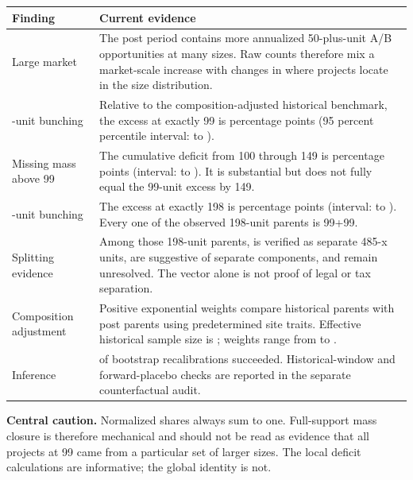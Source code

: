 \documentclass[10pt]{article}
\begin{document}
\begin{tabular}{>{\raggedright\arraybackslash}p{} p{}}
\toprule
\textbf{Finding} & \textbf{Current evidence} \\
\midrule
Large market & The post period contains more annualized 50-plus-unit A/B opportunities at many sizes. Raw counts therefore mix a market-scale increase with changes in where projects locate in the size distribution. \\
\addlinespace
99-unit bunching & Relative to the composition-adjusted historical benchmark, the excess at exactly 99 is \ExcessNinetyNine{} percentage points (95 percent percentile interval: \ExcessNinetyNineLower{} to \ExcessNinetyNineUpper{}). \\
\addlinespace
Missing mass above 99 & The cumulative deficit from 100 through 149 is \DeficitOneHundredOneFortyNine{} percentage points (interval: \DeficitOneHundredOneFortyNineLower{} to \DeficitOneHundredOneFortyNineUpper{}). It is substantial but does not fully equal the 99-unit excess by 149. \\
\addlinespace
198-unit bunching & The excess at exactly 198 is \ExcessOneNinetyEight{} percentage points (interval: \ExcessOneNinetyEightLower{} to \ExcessOneNinetyEightUpper{}). Every one of the \ExactOneNinetyEightParents{} observed 198-unit parents is 99+99. \\
\addlinespace
Splitting evidence & Among those 198-unit parents, \VerifiedOneNinetyEight{} is verified as separate 485-x units, \SuggestiveOneNinetyEight{} are suggestive of separate components, and \UnresolvedOneNinetyEight{} remain unresolved. The vector alone is not proof of legal or tax separation. \\
\addlinespace
Composition adjustment & Positive exponential weights compare \CalibrationHistoricalParents{} historical parents with \CalibrationPostParents{} post parents using predetermined site traits. Effective historical sample size is \CalibrationESS{}; weights range from \MinimumCalibrationWeight{} to \MaximumCalibrationWeight{}. \\
\addlinespace
Inference & \SuccessfulBootstraps{} of \RequestedBootstraps{} bootstrap recalibrations succeeded. Historical-window and forward-placebo checks are reported in the separate counterfactual audit. \\
\bottomrule
\end{tabular}

\vspace{10pt}
\textbf{Central caution.} Normalized shares always sum to one. Full-support mass
closure is therefore mechanical and should not be read as evidence that all
projects at 99 came from a particular set of larger sizes. The local deficit
calculations are informative; the global identity is not.
\end{document}
